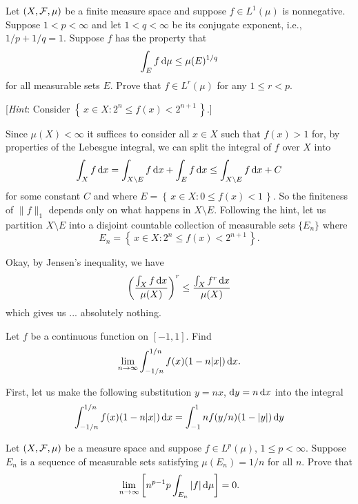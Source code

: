 \begin{problem}
  Let $(X,\mathcal{F},\mu)$ be a finite measure space and suppose $f\in L^1(\mu)$
  is nonnegative. Suppose $1<p<\infty$ and let $1<q<\infty$ be its
  conjugate exponent, i.e., $1/p+1/q=1$. Suppose $f$ has the property that
  \[
    \int_Ef\mathop{}\!\mathrm{d}\mu\leq \mu(E)^{1/q}
  \]
  for all measurable sets $E$. Prove that $f\in L^r(\mu)$ for any
  $1\leq r<p$.

  [\emph{Hint}: Consider $\left\{\,x\in X:2^n\leq f(x)<2^{n+1}\,\right\}$.]
\end{problem}
\begin{solution}
  Since $\mu(X)<\infty$ it suffices to consider all $x\in X$ such that
  $f(x)>1$ for, by properties of the Lebesgue integral, we can split the
  integral of $f$ over $X$ into
  \[
    \int_X f\mathop{}\!\mathrm{d} x=\int_{X\setminus E} f\mathop{}\!\mathrm{d} x+\int_{E} f\mathop{}\!\mathrm{d} x
    \leq\int_{X\setminus E} f\mathop{}\!\mathrm{d} x+C
  \]
  for some constant $C$ and where
  $E=\left\{\,x\in X:0\leq f(x)<1\,\right\}$. So the finiteness of
  $\|f\|_1$ depends only on what happens in $X\setminus E$. Following the
  hint, let us partition $X\setminus E$ into a disjoint countable
  collection of measurable sets $\{E_n\}$ where
  \[
    E_n=\left\{\,x\in X:2^n\leq f(x)<2^{n+1}\,\right\}.
  \]

  Okay, by Jensen's inequality, we have
  \[
    \left(\frac{\int_X f\mathop{}\!\mathrm{d} x}{\mu(X)}\right)^r
    \leq
    \frac{\int_Xf^r\mathop{}\!\mathrm{d} x}{\mu(X)}
  \]
  which gives us ... absolutely nothing.
\end{solution}

\begin{problem}
  Let $f$ be a continuous function on $[-1,1]$. Find
  \[
    \lim_{n\to\infty}\int_{-1/n}^{1/n} f(x)(1-n|x|)\mathop{}\!\mathrm{d} x.
  \]
\end{problem}
\begin{solution}
  First, let us make the following substitution $y=nx$, $\mathrm{d} y=n\mathop{}\!\mathrm{d} x$
  into the integral
  \[
    \int_{-1/n}^{1/n} f(x)(1-n|x|)\mathop{}\!\mathrm{d} x
    =\int_{-1}^1nf(y/n)(1-|y|)\mathop{}\!\mathrm{d} y
  \]
\end{solution}

\begin{problem}
  Let $(X,\mathcal{F},\mu)$ be a measure space and suppose $f\in L^p(\mu)$,
  $1\leq p<\infty$. Suppose $E_n$ is a sequence of measurable sets
  satisfying $\mu(E_n)=1/n$ for all $n$. Prove that
  \[
    \lim_{n\to\infty}\left[n^{p-1}{p}\int_{E_n}|f|\mathop{}\!\mathrm{d}\mu\right]=0.
  \]
\end{problem}
\begin{solution}
\end{solution}

